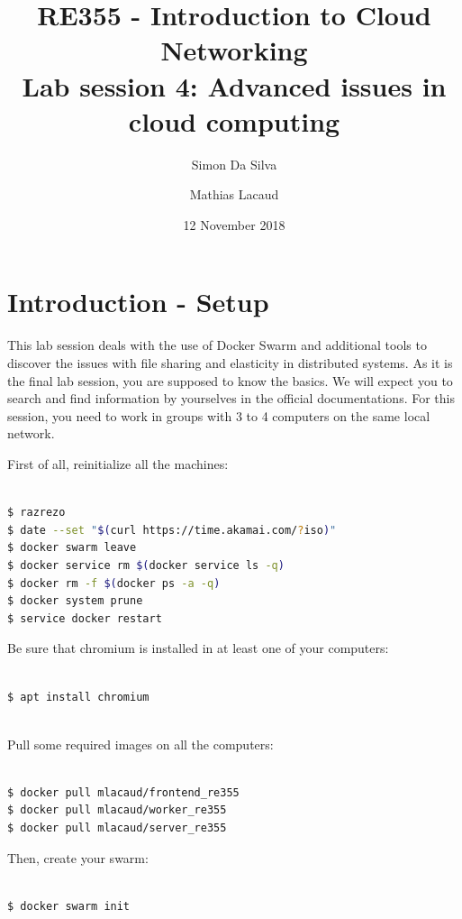 \documentclass[a4paper,11pt]{exam}
\date{12 November 2018}
\title{RE355 - Introduction to Cloud Networking\\
Lab session 4: Advanced issues in cloud computing}
\author{Simon Da Silva \and Mathias Lacaud}
\begin{document}
\maketitle

\section{Introduction - Setup}

This lab session deals with the use of Docker Swarm and additional tools to discover the issues with file sharing and elasticity in distributed systems. 
As it is the final lab session, you are supposed to know the basics.
We will expect you to search and find information by yourselves in the official documentations.
For this session, you need to work in groups with 3 to 4 computers on the same local network.

First of all, reinitialize all the machines:

\begin{lstlisting}[frame=single,language={sh}]  % Start your code-block

$ razrezo
$ date --set "$(curl https://time.akamai.com/?iso)"
$ docker swarm leave
$ docker service rm $(docker service ls -q)
$ docker rm -f $(docker ps -a -q)
$ docker system prune
$ service docker restart 

\end{lstlisting}

Be sure that chromium is installed in at least one of your computers: 

\begin{lstlisting}[frame=single,language={sh}]  % Start your code-block

$ apt install chromium
	
\end{lstlisting}

Pull some required images on all the computers:

\begin{lstlisting}[frame=single,language={sh}]  % Start your code-block

$ docker pull mlacaud/frontend_re355 
$ docker pull mlacaud/worker_re355 
$ docker pull mlacaud/server_re355

\end{lstlisting}

Then, create your swarm: 

\begin{lstlisting}[frame=single,language={sh}]  % Start your code-block

$ docker swarm init

\end{lstlisting}
\end{document}
